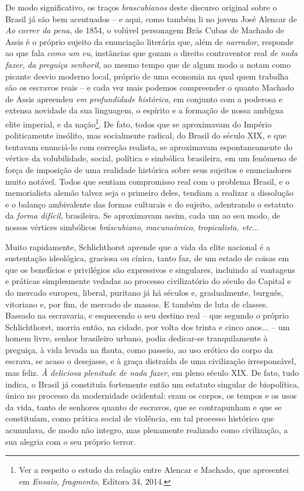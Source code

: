 De modo significativo, os traços \emph{brascubianos} deste discurso
original sobre o Brasil já são bem acentuados -- e aqui, como também li
no jovem José Alencar de \emph{Ao correr da pena}, de 1854, o volúvel
personagem Brás Cubas de Machado de Assis é o próprio sujeito da
enunciação literária que, além de \emph{narrador}, responde ao que fala
\emph{como um} \emph{eu}, instâncias que gozam o direito contraventor
real \emph{de nada fazer}, \emph{da preguiça senhoril}, ao mesmo tempo
que de algum modo a notam como picante desvio moderno local, próprio de
uma economia na qual quem trabalha são os escravos reais -- e cada vez
mais podemos compreender o quanto Machado de Assis apreendeu \emph{em
profundidade histórica}, em conjunto com a poderosa e extensa novidade
da sua linguagem, o espírito e a formação de nossa ambígua elite
imperial, e da nação\footnote{Ver a respeito o estudo da relação entre
  Alencar e Machado, que apresentei em \emph{Ensaio, fragmento}, Editora
  34, 2014.}. De fato, todos que se aproximavam do Império politicamente
insólito, mas socialmente radical, do Brasil do século XIX, e que
tentavam enunciá-lo com correção realista, se aproximavam
espontaneamente do vértice da volubilidade, social, política e simbólica
brasileira, em um fenômeno de força de imposição de uma realidade
histórica sobre seus sujeitos e enunciadores muito notável. Todos que
sentiam compromisso real com o problema Brasil, e o memorialista alemão
talvez seja o primeiro deles, tendiam a realizar a dissolução e o
balanço ambivalente das formas culturais e do sujeito, adentrando o
estatuto da \emph{forma difícil}, brasileira. Se aproximavam assim, cada
um ao seu modo, de nossos vértices simbólicos \emph{bráscubiano},
\emph{macunaímico}, \emph{tropicalista, etc}...

Muito rapidamente, Schlichthorst aprende que a vida da elite nacional é
a sustentação ideológica, graciosa ou cínica, tanto faz, de um estado de
coisas em que os benefícios e privilégios são expressivos e singulares,
incluindo aí vantagens e práticas simplesmente vedadas ao processo
civilizatório do século do Capital e do mercado europeu, liberal,
puritano já há séculos e, gradualmente, burguês, vitoriano e, por fim,
de mercado de massas. E também de luta de classes. Baseado na
escravaria, e esquecendo o seu destino real -- que segundo o próprio
Schlichthorst, morria então, na cidade, por volta dos trinta e cinco
anos... -- um homem livre, senhor brasileiro urbano, podia dedicar-se
tranquilamente à preguiça, à vida levada na flauta, como passeio, ao uso
erótico do corpo da escrava, se acaso o desejasse, e à graça distraída
de uma civilização irresponsável, mas feliz. \emph{À deliciosa plenitude
de nada fazer}, em pleno século XIX. De fato, tudo indica, o Brasil já
constituía fortemente então um estatuto singular de biopolítica, único
no processo da modernidade ocidental: eram os corpos, os tempos e os
usos da vida, tanto de senhores quanto de escravos, que se contrapunham
e que se constituíam, como prática social de violência, em tal processo
histórico que acumulava, de modo não integro, mas plenamente realizado
como civilização, a sua alegria com o seu próprio terror.

